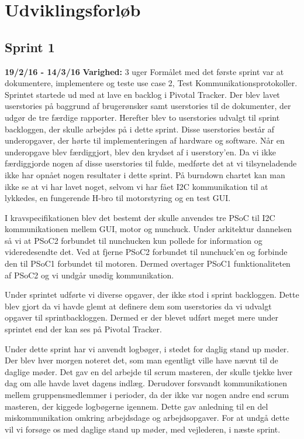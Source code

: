 \section{Udviklingsforløb}
	\subsection{Sprint 1}
	\textbf{19/2/16 - 14/3/16}\newline
	\textbf{Varighed:} 3 uger\newline
	Formålet med det første sprint var at dokumentere, implementere og teste use case 2, Test Kommunikationsprotokoller.
	Sprintet startede ud med at lave en backlog i Pivotal Tracker. Der blev lavet userstories på baggrund af brugerønsker samt userstories til de dokumenter, der udgør de tre færdige rapporter. Herefter blev to userstories udvalgt til sprint backloggen, der skulle arbejdes på i dette sprint. Disse userstories består af underopgaver, der hørte til implementeringen af hardware og software. Når en underopgave blev færdiggjort, blev den krydset af i userstory'en. Da vi ikke færdiggjorde nogen af disse userstories til fulde, medførte det at vi tilsyneladende ikke har opnået nogen resultater i dette sprint. På burndown chartet kan man ikke se at vi har lavet noget, selvom vi har fået I2C kommunikation til at lykkedes, en fungerende H-bro til motorstyring og en test GUI. \newline
	
	I kravspecifikationen blev det bestemt der skulle anvendes tre PSoC til I2C kommunikationen mellem GUI, motor og nunchuck. Under arkitektur dannelsen så vi at PSoC2 forbundet til nunchucken kun pollede for information og videredesendte det. Ved at fjerne PSoC2 forbundet til nunchuck'en og forbinde den til PSoC1 forbundet til motoren. Dermed overtager PSoC1 funktionaliteten af PSoC2 og vi undgår unødig kommunikation. \newline
	
	Under sprintet udførte vi diverse opgaver, der ikke stod i sprint backloggen. Dette blev gjort da vi havde glemt at definere dem som userstories da vi udvalgt opgaver til sprintbackloggen. Dermed er der blevet udført meget mere under sprintet end der kan ses på Pivotal Tracker. \newline
	
	Under dette sprint har vi anvendt logbøger, i stedet for daglig stand up møder. Der blev hver morgen noteret det, som man egentligt ville have nævnt til de daglige møder. Det gav en del arbejde til scrum masteren, der skulle tjekke hver dag om alle havde lavet dagens indlæg. Derudover forsvandt kommunikationen mellem gruppensmedlemmer i perioder, da der ikke var nogen andre end scrum masteren, der kiggede logbøgerne igennem. Dette gav anledning til en del miskommunikation omkring arbejdsdage og arbejdsopgaver. For at undgå dette vil vi forsøge os med daglige stand up møder, med vejlederen, i næste sprint. \newline
	
